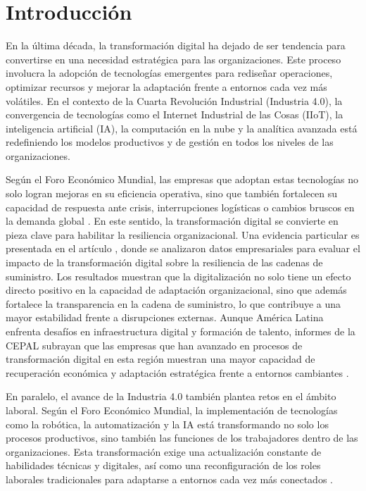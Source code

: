
\label{chap:Intro}


\cleardoublepage

\section*{Introducción}

En la última década, la transformación digital ha dejado de ser tendencia para convertirse en una necesidad estratégica para las organizaciones. Este proceso involucra la adopción de tecnologías emergentes para rediseñar operaciones, optimizar recursos y mejorar la adaptación frente a entornos cada vez más volátiles. En el contexto de la Cuarta Revolución Industrial (Industria 4.0), la convergencia de tecnologías como el Internet Industrial de las Cosas (IIoT), la inteligencia artificial (IA), la computación en la nube y la analítica avanzada está redefiniendo los modelos productivos y de gestión en todos los niveles de las organizaciones.



Según el Foro Económico Mundial, las empresas que adoptan estas tecnologías no solo logran mejoras en su eficiencia operativa, sino que también fortalecen su capacidad de respuesta ante crisis, interrupciones logísticas o cambios bruscos en la demanda global \cite{wef1}. En este sentido, la transformación digital se convierte en pieza clave para habilitar la resiliencia organizacional. Una evidencia particular es presentada en el artículo \cite{scd1}, donde se analizaron datos empresariales para evaluar el impacto de la transformación digital sobre la resiliencia de las cadenas de suministro. Los resultados muestran que la digitalización no solo tiene un efecto directo positivo en la capacidad de adaptación organizacional, sino que además fortalece la transparencia en la cadena de suministro, lo que contribuye a una mayor estabilidad frente a disrupciones externas. Aunque América Latina enfrenta desafíos en infraestructura digital y formación de talento, informes de la CEPAL subrayan que las empresas que han avanzado en procesos de transformación digital en esta región muestran una mayor capacidad de recuperación económica y adaptación estratégica frente a entornos cambiantes \cite{cepaL}.

En paralelo, el avance de la Industria 4.0 también plantea retos en el ámbito laboral. Según el Foro Económico Mundial, la implementación de tecnologías como la robótica, la automatización y la IA está transformando no solo los procesos productivos, sino también las funciones de los trabajadores dentro de las organizaciones. Esta transformación exige una actualización constante de habilidades técnicas y digitales, así como una reconfiguración de los roles laborales tradicionales para adaptarse a entornos cada vez más conectados \cite{wef2}.

